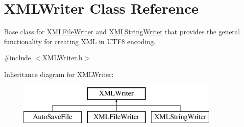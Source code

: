 \hypertarget{class_x_m_l_writer}{}\section{X\+M\+L\+Writer Class Reference}
\label{class_x_m_l_writer}


Base class for \hyperlink{class_x_m_l_file_writer}{X\+M\+L\+File\+Writer} and \hyperlink{class_x_m_l_string_writer}{X\+M\+L\+String\+Writer} that provides the general functionality for creating X\+ML in U\+T\+F8 encoding.  




{\ttfamily \#include $<$X\+M\+L\+Writer.\+h$>$}

Inheritance diagram for X\+M\+L\+Writer\+:\begin{figure}[H]
\begin{center}
\leavevmode
\includegraphics[height=2.000000cm]{class_x_m_l_writer}
\end{center}
\end{figure}
